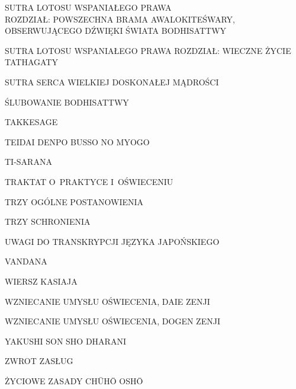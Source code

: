 \par\noindent SUTRA LOTOSU WSPANIAŁEGO PRAWA\\ROZDZIAŁ: POWSZECHNA BRAMA AWALOKITEŚWARY, OBSERWUJĄCEGO DŹWIĘKI ŚWIATA BODHISATTWY \dotfill \makebox[1.0cm][r]{\pageref{sutralotosu_powszechna_brama}}
\par\noindent SUTRA LOTOSU WSPANIAŁEGO PRAWA ROZDZIAŁ: WIECZNE ŻYCIE TATHAGATY \dotfill \makebox[1.0cm][r]{\pageref{sutralotosu_wieczne_zycie}}
\par\noindent SUTRA SERCA WIELKIEJ DOSKONAŁEJ MĄDROŚCI \dotfill \makebox[1.0cm][r]{\pageref{serce_doskonalej_madrosci}}
\par\noindent ŚLUBOWANIE BODHISATTWY \dotfill \makebox[1.0cm][r]{\pageref{slubowanie_bodhisattwy}}
\par\noindent TAKKESAGE \dotfill \makebox[1.0cm][r]{\pageref{tekkesage}}
\par\noindent TEIDAI DENPO BUSSO NO MYOGO \dotfill \makebox[1.0cm][r]{\pageref{teidai_denpo_busso_no_myogo}}
\par\noindent TI-SARANA \dotfill \makebox[1.0cm][r]{\pageref{ti-sarana}}
\par\noindent TRAKTAT O~PRAKTYCE I~OŚWIECENIU \dotfill \makebox[1.0cm][r]{\pageref{traktat_o_praktyce}}
\par\noindent TRZY OGÓLNE POSTANOWIENIA \dotfill \makebox[1.0cm][r]{\pageref{trzy_ogolne_postanowienia}}
\par\noindent TRZY SCHRONIENIA \dotfill \makebox[1.0cm][r]{\pageref{trzy_schronienia}}
\par\noindent UWAGI DO TRANSKRYPCJI JĘZYKA JAPOŃSKIEGO \dotfill \makebox[1.0cm][r]{\pageref{uwagi_do_transkrypcji}}
\par\noindent VANDANA \dotfill \makebox[1.0cm][r]{\pageref{vandana}}
\par\noindent WIERSZ KASIAJA \dotfill \makebox[1.0cm][r]{\pageref{wiersz_kesy}}
\par\noindent WZNIECANIE UMYSŁU OŚWIECENIA, DAIE ZENJI \dotfill \makebox[1.0cm][r]{\pageref{wzniecanie_umyslu_oswiecenia_daie}}
\par\noindent WZNIECANIE UMYSŁU OŚWIECENIA, DOGEN ZENJI \dotfill \makebox[1.0cm][r]{\pageref{wzniecanie_umyslu_oswiecenia_dogen}}
\par\noindent YAKUSHI SON SHO DHARANI \dotfill \makebox[1.0cm][r]{\pageref{yakushi_son_sho_dharani}}
\par\noindent ZWROT ZASŁUG \dotfill \makebox[1.0cm][r]{\pageref{zwrot_zaslug}}
\par\noindent ŻYCIOWE ZASADY CH\=UH\=O OSH\=O \dotfill \makebox[1.0cm][r]{\pageref{zyciowe_zasady_chuho_osho}}

